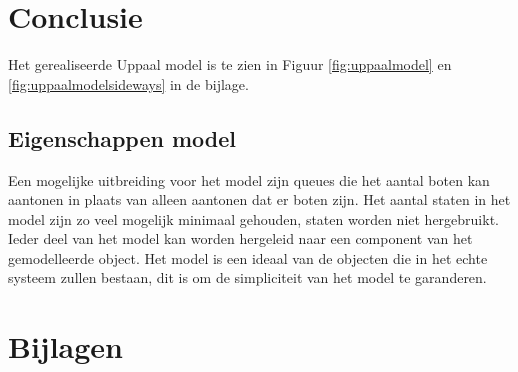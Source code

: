 \documentclass{article}
\begin{document}
\section{Conclusie}

Het gerealiseerde Uppaal model is te zien in Figuur \ref{fig:uppaalmodel} en \ref{fig:uppaalmodelsideways} in de bijlage. \\

\subsection{Eigenschappen model}
Een mogelijke uitbreiding voor het model zijn queues die het aantal boten kan aantonen in plaats van alleen aantonen dat er boten zijn. Het aantal staten in het model zijn zo veel mogelijk minimaal gehouden, staten worden niet hergebruikt. Ieder deel van het model kan worden hergeleid naar een component van het gemodelleerde object. Het model is een ideaal van de objecten die in het echte systeem zullen bestaan, dit is om de simpliciteit van het model te garanderen.




\newpage
\section{Bijlagen}
\end{document}
